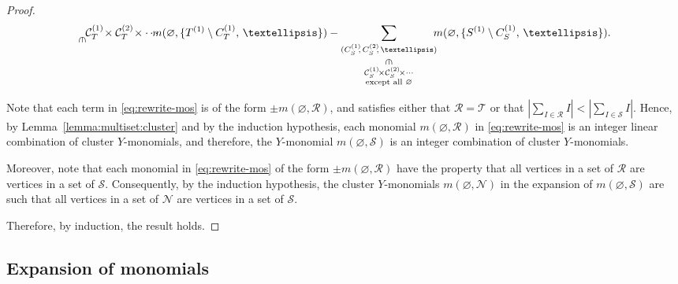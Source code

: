 \documentclass[11pt]{article}
\theoremstyle{definition}
\numberwithin{equation}{section}
\newcommand{\mtp}[1]{^{(#1)}} \newcommand{\graph}{\varGamma}
\newcommand{\monomial}[2]{m(#1, #2)}
\begin{document}
\begin{proof}
\begin{equation}
{{            \rotatebox{-90}{\(\in\)} \\
            \mathcal{C}_{T}\mtp{1}\!\times \mathcal{C}_{T}\mtp{2}\!\times \cdots }
            }
            \mkern -9mu
            \monomial{\varnothing}{
                \{ 
                    T\mtp{1} \setminus C_{T}\mtp{1},\,
                    \dots
                \}
            }
        -
        \sum_{ \substack{
            (C_S\mtp{1}\!\!,\,
            C_S\mtp{2}\!\!,\,\dots) \\
            \rotatebox{-90}{\(\in\)} \\
            \mathcal{C}_S\mtp{1}\!\times \mathcal{C}_S\mtp{2}\!\times \cdots \\
            \text{except all }\varnothing} 
            }
            \mkern -9mu
            \monomial{\varnothing}{
                \{ 
                    S\mtp{1} \setminus C_S\mtp{1},\,
                    \dots
                \}
            }.
    \end{equation}

    Note that each term in \eqref{eq:rewrite-mos} is of the form \(\pm \monomial{\varnothing}{\mathcal{R}}\),
    and satisfies either that \(\mathcal{R} = \mathcal{T}\) or that \(\left|\sum_{I \in \mathcal{R}} I\right| < \left|\sum_{I \in \mathcal{S}} I\right|\).
    Hence, by Lemma~\ref{lemma:multiset:cluster} and by the induction hypothesis, each monomial \(\monomial{\varnothing}{\mathcal{R}}\) in \eqref{eq:rewrite-mos} is an integer linear combination of cluster \(Y\)-monomials, and therefore, the \(Y\)-monomial \(\monomial{\varnothing}{\mathcal{S}}\) is an integer combination of cluster \(Y\)-monomials.

    Moreover, note that each monomial in \eqref{eq:rewrite-mos} of the form \(\pm \monomial{\varnothing}{\mathcal{R}}\) have the property that all vertices in a set of \(\mathcal{R}\) are vertices in a set of \(\mathcal{S}\).
    Consequently, by the induction hypothesis, the cluster \(Y\)-monomials \(\monomial{\varnothing}{\mathcal{N}}\) in the expansion of \(\monomial{\varnothing}{\mathcal{S}}\) are such that all vertices in a set of \(\mathcal{N}\) are vertices in a set of \(\mathcal{S}\).

    Therefore, by induction, the result holds.
\end{proof}

\subsection{Expansion of monomials} \label{subsection:proofofspanningset}
\end{document}
